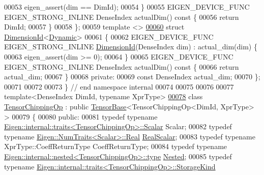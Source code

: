 \begin{DoxyCode}
00053     eigen\_assert(dim == DimId);
00054   \}
00055   EIGEN\_DEVICE\_FUNC EIGEN\_STRONG\_INLINE DenseIndex actualDim()\textcolor{keyword}{ const }\{
00056     \textcolor{keywordflow}{return} DimId;
00057   \}
00058 \};
00059 \textcolor{keyword}{template} <>
\hyperlink{struct_eigen_1_1internal_1_1_dimension_id_3_01_dynamic_01_4}{00060} \textcolor{keyword}{struct }\hyperlink{struct_eigen_1_1internal_1_1_dimension_id}{DimensionId}<\hyperlink{namespace_eigen_ad81fa7195215a0ce30017dfac309f0b2}{Dynamic}>
00061 \{
00062   EIGEN\_DEVICE\_FUNC EIGEN\_STRONG\_INLINE \hyperlink{struct_eigen_1_1internal_1_1_dimension_id}{DimensionId}(DenseIndex dim) : actual\_dim(dim) \{
00063     eigen\_assert(dim >= 0);
00064   \}
00065   EIGEN\_DEVICE\_FUNC EIGEN\_STRONG\_INLINE DenseIndex actualDim()\textcolor{keyword}{ const }\{
00066     \textcolor{keywordflow}{return} actual\_dim;
00067   \}
00068  \textcolor{keyword}{private}:
00069   \textcolor{keyword}{const} DenseIndex actual\_dim;
00070 \};
00071 
00072 
00073 \}  \textcolor{comment}{// end namespace internal}
00074 
00075 
00076 
00077 \textcolor{keyword}{template}<DenseIndex DimId, \textcolor{keyword}{typename} XprType>
\hyperlink{class_eigen_1_1_tensor_chipping_op}{00078} \textcolor{keyword}{class }\hyperlink{class_eigen_1_1_tensor_chipping_op}{TensorChippingOp} : \textcolor{keyword}{public} \hyperlink{class_eigen_1_1_tensor_base}{TensorBase}<TensorChippingOp<DimId, XprType> >
00079 \{
00080   \textcolor{keyword}{public}:
00081   \textcolor{keyword}{typedef} \textcolor{keyword}{typename} \hyperlink{struct_eigen_1_1internal_1_1traits}{Eigen::internal::traits<TensorChippingOp>::Scalar}
       Scalar;
00082   \textcolor{keyword}{typedef} \textcolor{keyword}{typename} \hyperlink{group___sparse_core___module}{Eigen::NumTraits<Scalar>::Real} 
      \hyperlink{group___sparse_core___module}{RealScalar};
00083   \textcolor{keyword}{typedef} \textcolor{keyword}{typename} XprType::CoeffReturnType CoeffReturnType;
00084   \textcolor{keyword}{typedef} \textcolor{keyword}{typename} \hyperlink{class_eigen_1_1internal_1_1_tensor_lazy_evaluator_writable}{Eigen::internal::nested<TensorChippingOp>::type}
       \hyperlink{class_eigen_1_1internal_1_1_tensor_lazy_evaluator_writable}{Nested};
00085   \textcolor{keyword}{typedef} \textcolor{keyword}{typename} \hyperlink{struct_eigen_1_1internal_1_1traits}{Eigen::internal::traits<TensorChippingOp>::StorageKind}

\end{DoxyCode}
